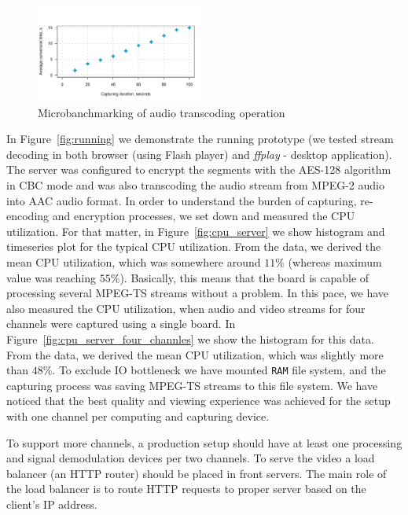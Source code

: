 \begin{figure}[!h]
\includegraphics[width=0.5\textwidth]{graphics/microbanchmarking/mpeg2_ts_conversion.pdf}
\caption{Microbanchmarking of audio transcoding operation}
\label{fig:aac_enc}
\end{figure}

In Figure~\ref{fig:running} we demonstrate the running prototype (we tested
stream decoding in both browser (using Flash player) and 
\textit{ffplay} - desktop application). The server
was configured to encrypt the segments with the AES-128 algorithm in CBC
mode and was also transcoding the audio stream from MPEG-2 audio into 
AAC audio format. In order to understand the burden of capturing, 
re-encoding and encryption processes, we set down and measured the 
CPU utilization. For that matter, in Figure~\ref{fig:cpu_server} we show histogram 
and timeseries plot for the typical CPU utilization. From the data, 
we derived the mean CPU utilization, which was somewhere around $11\%$ 
(whereas maximum value was reaching $55\%$).
Basically, this  means that the board is capable of processing several 
MPEG-TS streams without a problem. 
In this pace, we have also measured the CPU utilization, when audio and video streams 
for four channels were captured using a single board. In Figure~\ref{fig:cpu_server_four_channles}
we show the histogram for this data. From the data, we derived
the mean CPU utilization, which was slightly more than $48\%$. 
To exclude IO bottleneck we have mounted \texttt{RAM} file system, 
and the capturing process was saving MPEG-TS streams to this file system.
We have noticed that the best quality and viewing experience was achieved for
the setup with one channel per computing and capturing device.

To support more channels, a production setup should have at least one processing 
and signal demodulation devices per two channels. To serve the video a load balancer
(an HTTP router) should be placed in front servers. The main role of the load balancer is 
to route HTTP requests to proper server based on the client's IP address.

